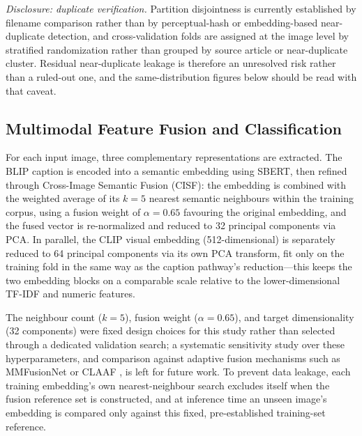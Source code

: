 \documentclass[conference,a4paper]{IEEEtran}
\begin{document}
\emph{Disclosure: duplicate verification.} Partition disjointness is currently
established by filename comparison rather than by perceptual-hash or
embedding-based near-duplicate detection, and cross-validation folds are
assigned at the image level by stratified randomization rather than grouped by
source article or near-duplicate cluster. Residual near-duplicate leakage is
therefore an unresolved risk rather than a ruled-out one, and the
same-distribution figures below should be read with that caveat.

\subsection{Multimodal Feature Fusion and Classification}

For each input image, three complementary representations are extracted. The
BLIP caption is encoded into a semantic embedding using SBERT, then refined
through Cross-Image Semantic Fusion (CISF): the embedding is combined with the
weighted average of its $k=5$ nearest semantic neighbours within the training
corpus, using a fusion weight of $\alpha=0.65$ favouring the original
embedding, and the fused vector is re-normalized and reduced to 32 principal
components via PCA. In parallel, the CLIP visual embedding (512-dimensional)
is separately reduced to 64 principal components via its own PCA transform,
fit only on the training fold in the same way as the caption pathway's
reduction---this keeps the two embedding blocks on a comparable scale relative
to the lower-dimensional TF-IDF and numeric features.

The neighbour count ($k=5$), fusion weight ($\alpha=0.65$), and target
dimensionality (32 components) were fixed design choices for this study rather
than selected through a dedicated validation search; a systematic sensitivity
study over these hyperparameters, and comparison against adaptive fusion
mechanisms such as MMFusionNet \cite{mmfusionnet} or CLAAF \cite{claaf}, is
left for future work. To prevent data leakage, each training embedding's own
nearest-neighbour search excludes itself when the fusion reference set is
constructed, and at inference time an unseen image's embedding is compared
only against this fixed, pre-established training-set reference.
\end{document}

